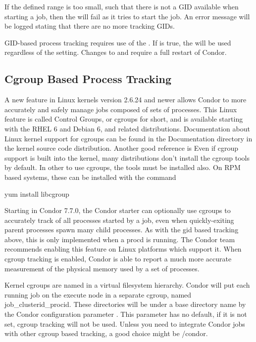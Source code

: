 If the defined range is too small, such that there is not a GID available
when starting a job,
then the  will fail as it tries to start the job.
An error message will be logged stating that there are no more tracking GIDs.

GID-based process tracking requires use of the . If
 is true, the  will
be used regardless of the  setting.  Changes to
 and  require
a full restart of Condor.

\subsection{\label{sec:CGroupTracking}Cgroup Based Process Tracking} 

A new feature in Linux kernels version 2.6.24 and newer allows Condor to
more accurately and safely manage jobs composed of sets of processes.
This Linux feature is called Control Groups, or cgroups for short, and 
is available starting with the RHEL 6 and Debian 6, and related distributions.  
Documentation about Linux kernel support for cgroups can be found in
the Documentation directory in the kernel source code distribution. Another
good reference is 
Even if cgroup support is built into the kernel, many distributions don't
install the cgroup tools by default.  In other to use cgroups, the tools
must be installed also.  On RPM based systems, these can be installed
with the command

yum install libcgroup\\\*

Starting in Condor 7.7.0, the Condor starter can optionally use cgroups
to accurately track of all processes started by a job, even when 
quickly-exiting parent processes spawn many child processes.  As with 
the gid based tracking above, this is only implemented when a procd is running.
The Condor team recommends enabling this feature on Linux platforms which support it.
When cgroup tracking is enabled, Condor is able to report a much more accurate
measurement of the physical memory used by a set of processes.

Kernel cgroups are named in a virtual filesystem hierarchy. Condor will put each
running job on the execute node in a separate cgroup, named job\_clusterid\_procid.
These directories will be under a base directory name by the Condor configuration 
parameter .  This parameter has no default, if it is not set, cgroup
tracking will not be used.  Unless you need to integrate Condor jobs with other
cgroup based tracking, a good choice might be /condor. 

